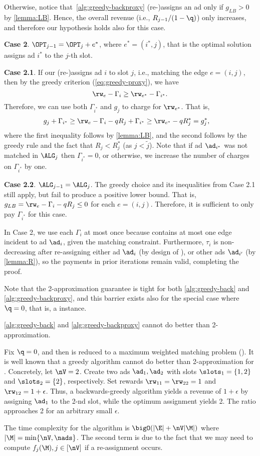 \begin{proofE}
	Otherwise, notice that~\cref{alg:greedy-backproxy} (re-)assigns an ad only if $g_{LB} > 0$ by \cref{lemma:LB}.
	Hence, the overall revenue (i.e., $R_{j-1}/(1-\q)$) only increases, 
	and therefore our hypothesis holds also for this case.
	
	\textbf{Case 2}. $\OPT_{j-1} = \OPT_{j} + e^*$, where $e^* = (i^*, j)$, that is the optimal solution assigns ad $i^*$ to the $j$-th slot.
	
	\textbf{Case 2.1}. If our \ALG (re-)assigns ad $i$ to slot $j$, i.e.,  matching the edge $e=(i, j)$, then by the greedy criterion (\cref{eq:greedy-proxy}), we have
	\[
	\rw_e - \Gamma_i \ge \rw_{e^*} - \Gamma_{i^*} .
	\]
	Therefore, we can use both $\Gamma_{i^*}$ and $g_j$ to charge for $\rw_{e^*}$. 
	That is,
	\begin{align*}
		g_j + \Gamma_{i^*} 
		&\ge \rw_e - \Gamma_{i} - q R_j + \Gamma_{i^*} %
		\ge \rw_{e^*} - q R_j^* = g^*_j,
	\end{align*}
	where the first inequality follows by \cref{lemma:LB}, and
	the second follows by the greedy rule and the fact that $R_j < R_j^*$ (as $j < \tilde{j}$).
	Note that if ad $\ad_{i^*}$ was not matched in $\ALG_j$ then $\Gamma_{i^*} = 0$,
	or otherwise, we increase the number of charges on $\Gamma_{i^*}$ by one. 
	
	\textbf{Case 2.2}. $\ALG_{j-1} = \ALG_{j}$. 
	The greedy choice and its inequalities from Case 2.1 still apply, but fail to produce a positive lower bound. 
	That is, 
	$g_{LB} = \rw_e - \Gamma_{i} - q R_j \le 0$ for each $e=(i,j)$.
	Therefore, it is sufficient to only pay $\Gamma_{i^*}$ for this case.~%
	
	In Case 2, we use each $\Gamma_i$ at most once because \OPT contains at most one edge incident to ad $\ad_i$, given the matching constraint.
	Furthermore, $\tau_i$ is non-decreasing after re-assigning 
	either ad $\ad_i$ (by design of \alggbackproxy),
	or other ads $\ad_{i'}$ (by \cref{lemma:R}),
	so the payments in prior iterations remain valid,
	completing the proof.
\end{proofE}

Note that the 2-approximation guarantee is tight for both \cref{alg:greedy-back} and \cref{alg:greedy-backproxy}, and 
this barrier exists also for the special case where $\q = 0$, that is, a \mwm instance.

\begin{propositionE}
	\cref{alg:greedy-back} and \cref{alg:greedy-backproxy} cannot do better than 2-approximation.
\end{propositionE}
\begin{proofE}
	Fix $\q=0$, and then \streamads is reduced to a maximum weighted matching problem (\mwm).
	It is well known that a greedy algorithm cannot do better than 2-approximation for \mwm.
	Concretely, let $\nV=2$.
	Create two ads $\ad_1, \ad_2$ with slots $\slots_1 = \{1,2\}$ and $\slots_2 = \{2\}$, respectively.
	Set rewards $\rw_{11} = \rw_{22} = 1$ and $\rw_{12} = 1+\epsilon$.
	Thus, a backwards-greedy algorithm yields a revenue of $1+\epsilon$ by assigning $\ad_1$ to the 2-nd slot,
	while the optimum assignment yields 2.
	The ratio approaches 2 for an arbitrary small $\epsilon$.
\end{proofE}


The time complexity for the \alggbackproxy algorithm is 
$\bigO(|\E| + \nV |\M|)$ 
where $|\M| = \min \{ \nV, \nads \}$.
The second term is due to the fact that we may need to compute $f_j(\M), j\in[\nV]$ if a re-assignment occurs.
